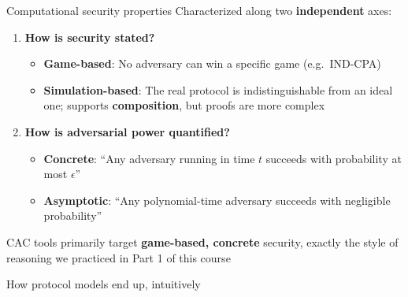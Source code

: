 \ifdefined\PRESENTATION\else\PassOptionsToClass{handout}{beamer}\fi\documentclass[aspectratio=169, lualatex]{beamer}
\begin{document}
\begin{frame}{Computational security properties}
	Characterized along two \textbf{independent} axes:
	\vspace{0.5em}
	\begin{enumerate}
		\item \textbf{How is security stated?}
		      \begin{itemize}
			      \item \textbf{Game-based}: No adversary can win a specific game (e.g.\ IND-CPA)
			      \item \textbf{Simulation-based}: The real protocol is indistinguishable from an ideal one; supports \textbf{composition}, but proofs are more complex
		      \end{itemize}
		      \vspace{0.5em}
		\item \textbf{How is adversarial power quantified?}
		      \begin{itemize}
			      \item \textbf{Concrete}: ``Any adversary running in time $t$ succeeds with probability at most $\epsilon$''
			      \item \textbf{Asymptotic}: ``Any polynomial-time adversary succeeds with negligible probability''
		      \end{itemize}
	\end{enumerate}
	\vspace{0.5em}
	\begin{center}
		CAC tools primarily target \textbf{game-based, concrete} security, exactly the style of reasoning we practiced in Part 1 of this course
	\end{center}
\end{frame}

\begin{frame}{How protocol models end up, intuitively}
\end{frame}
\end{document}
